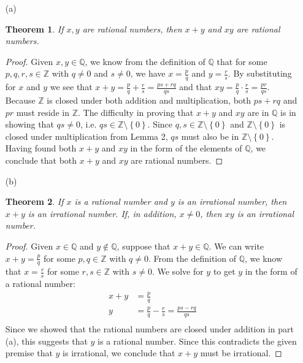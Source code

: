 \documentclass[12pt]{article}
\newtheorem*{thm}{Theorem}
\begin{document}
\begin{itemize}
\item[(a)]
\begin{thm}
If $x, y$ are rational numbers, then $x + y$ and $xy$ are rational numbers.
\end{thm}
\begin{proof}
Given $x, y \in \mathbb{Q}$, we know from the definition of $\mathbb{Q}$ that for some $p,q,r,s \in \mathbb{Z}$ with $q \neq 0$ and $s \neq 0$, we have $x = \frac{p}{q}$ and $y = \frac{r}{s}$. By substituting for $x$ and $y$ we see that $x + y = \frac{p}{q} + \frac{r}{s} = \frac{ps + rq}{qs}$ and that $xy = \frac{p}{q} \cdot \frac{r}{s} = \frac{pr}{qs}$. Because $\mathbb{Z}$ is closed under both addition and multiplication, both $ps + rq$ and $pr$ must reside in $\mathbb{Z}$. The difficulty in proving that $x + y$ and $xy$ are in $\mathbb{Q}$ is in showing that $qs \neq 0$, i.e. $qs \in \mathbb{Z} \setminus \left\{0\right\}$. Since $q, s \in \mathbb{Z} \setminus \left\{0\right\}$ and $\mathbb{Z} \setminus \left\{0\right\}$ is closed under multiplication from Lemma 2, $qs$ must also be in $\mathbb{Z} \setminus \left\{0\right\}$. Having found both $x + y$ and $xy$ in the form of the elements of $\mathbb{Q}$, we conclude that both $x + y$ and $xy$ are rational numbers.
\end{proof}
\item[(b)]
\begin{thm}
If $x$ is a rational number and $y$ is an irrational number, then $x + y$ is an irrational number. If, in addition, $x \neq 0$, then $xy$ is an irrational number.
\end{thm}
\begin{proof}
Given $x \in \mathbb{Q}$ and $y \notin \mathbb{Q}$, suppose that $x + y \in \mathbb{Q}$. We can write $x + y = \frac{p}{q}$ for some $p, q \in \mathbb{Z}$ with $q \neq 0$. From the definition of $\mathbb{Q}$, we know that $x = \frac{r}{s}$ for some $r, s \in \mathbb{Z}$ with $s \neq 0$. We solve for $y$ to get $y$ in the form of a rational number:
\begin{align*}
x + y &= \frac{p}{q} \\
y &= \frac{p}{q} - \frac{r}{s} = \frac{ps - rq}{qs} \\
\end{align*}
Since we showed that the rational numbers are closed under addition in part (a), this suggests that $y$ is a rational number. Since this contradicts the given premise that $y$ is irrational, we conclude that $x + y$ must be irrational.


\end{proof}
\end{itemize}
\end{document}
